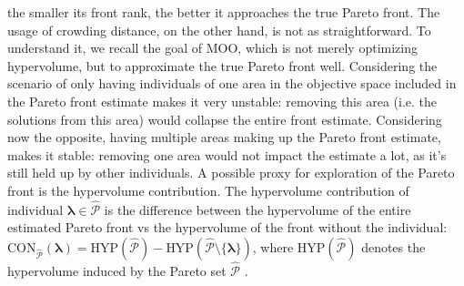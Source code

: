 \documentclass[twoside,11pt]{article}
\begin{document}
the smaller its front rank, the better it approaches the true Pareto front.
The usage of crowding distance, on the other hand, is not as straightforward. To understand it, we recall the goal of MOO, which is not merely optimizing
hypervolume, but to approximate the true Pareto front well.
Considering the scenario of only having individuals of one area in the objective space included in the Pareto front estimate makes it very unstable: removing this
area (i.e. the solutions from this area) would collapse the entire front estimate.
Considering now the opposite, having multiple areas making up the Pareto front estimate, makes it stable: removing one area would not impact the estimate a lot,
as it's still held up by other individuals. \citep[p. 185, pp. 189-192]{genetic_algos}
A possible proxy for exploration of the Pareto front is the hypervolume contribution. The hypervolume contribution of individual
$\boldsymbol\lambda\in\hat{\mathcal{P}}$ is the difference between the hypervolume of the entire estimated Pareto front vs the hypervolume of the front without the
individual: $\text{CON}_{\hat{\mathcal{P}}}(\boldsymbol\lambda)=\text{HYP}(\hat{\mathcal{P}})-\text{HYP}(\hat{\mathcal{P}}\setminus\{\boldsymbol\lambda\})$,
where $\text{HYP}(\hat{\mathcal{P}})$ denotes the hypervolume induced by the Pareto set $\hat{\mathcal{P}}$ \citep[p. 384]{10.5555/1943267.1943271}.


\end{document}
